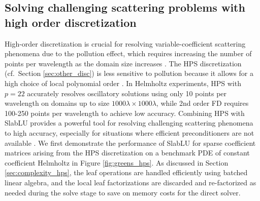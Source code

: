 \documentclass[11pt]{amsart}
\begin{document}
\subsection{Solving challenging scattering problems with high order discretization}
\label{sec:hps_numerical}

High-order discretization is crucial for resolving variable-coefficient scattering phenomena due to the pollution effect, 
which requires increasing the number of points per wavelength as the domain size increases \cite{beriot2016efficient,deraemaeker1999dispersion}. 
The HPS discretization (cf.~Section \ref{sec:other_disc}) is less sensitive to pollution because
it allows for a high choice of local polynomial order \cite{gillman2014direct,martinsson2013direct}. In Helmholtz experiments, HPS with $p=22$ accurately resolves oscillatory solutions 
using only 10 points per wavelength on domains up to size $1000\lambda \times 1000\lambda$, while 2nd order FD requires 100-250 points per wavelength to achieve low accuracy. Combining HPS with SlabLU provides a powerful tool for resolving challenging scattering phenomena to high accuracy, especially for situations where 
efficient preconditioners are not available \cite{ernst2012difficult}.
We first demonstrate the performance of SlabLU for sparse coefficient matrices arising from the HPS discretization
on a benchmark PDE of constant coefficient Helmholtz in Figure \ref{fig:greens_hps}. As discussed in Section \ref{sec:complexity_hps}, the leaf operations are handled efficiently using batched linear algebra, and the local leaf factorizations are discarded and re-factorized as needed during the solve stage to save on memory costs for the direct solver.
\end{document}

